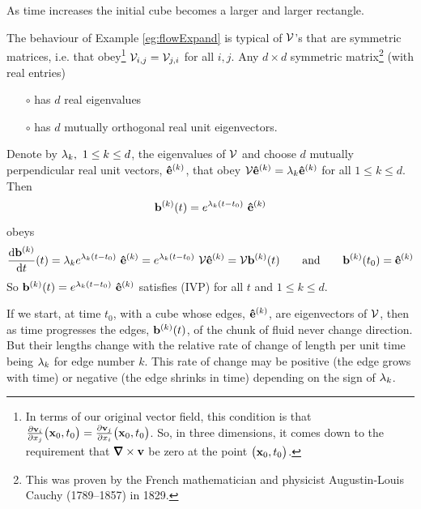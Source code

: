 As time increases the initial cube becomes a larger and larger rectangle.

\begin{eg}\label{eg:flowExpandB}
The behaviour of Example \ref{eg:flowExpand} is typical of $\mathcal{V}$'s 
that are symmetric matrices,
i.e. that obey\footnote{In terms of our original vector field, this condition
is that 
$\frac{\partial \mathbf{v}_i}{\partial x_j}\big(\mathbf{x}_0,t_0\big)
=\frac{\partial \mathbf{v}_j}{\partial x_i}\big(\mathbf{x}_0,t_0\big)$.
So, in three dimensions, it comes down to the requirement that 
$\vnabla\times\vv$ be zero at the point $\big(\mathbf{x}_0,t_0\big)$.}
 $\mathcal{V}_{i,j}=\mathcal{V}_{j,i}$ for all $i,j$. 
Any $d\times d$ symmetric matrix\footnote{This was proven by the French mathematician and physicist Augustin-Louis Cauchy (1789--1857) in 1829.} 
(with real entries)
\begin{itemize}\itemsep1pt \parskip0pt  %
\item[$\circ$]
 has $d$ real eigenvalues
\item[$\circ$] 
has $d$ mutually orthogonal real unit eigenvectors.
\end{itemize}
Denote by $\lambda_k,\ 1\le k\le d$, the eigenvalues of $\mathcal{V}$ and choose
$d$ mutually perpendicular real unit vectors, $\mathbf{\hat e}^{(k)}$,  that obey 
$\mathcal{V}\mathbf{\hat e}^{(k)}=\lambda_k\mathbf{\hat e}^{(k)}$ for all $1\le k\le d$. Then
\begin{equation*}
\vb^{(k)}(t)=e^{\la_k (t-t_0)}\ \ha{k}
\end{equation*}
obeys
\begin{equation*}
\diff{\vb^{(k)}}{t}(t)=\la_ke^{\la_k (t-t_0)}\ \ha{k}=e^{\la_k (t-t_0)}\ \cV\ha{k}
=\cV\vb^{(k)}(t)\qquad\text{and}\qquad
\vb^{(k)}(t_0)= \ha{k}
\end{equation*}
So $\mathbf{b}^{(k)}(t)=e^{\lambda_k (t-t_0)}\ \mathbf{\hat e}^{(k)}$ satisfies (IVP) for all $t$ and 
$1\le k\le d$. 

If we start, at time $t_0$, with a cube whose edges, $\mathbf{\hat e}^{(k)}$,
 are eigenvectors of $\mathcal{V}$, then as time progresses the edges, 
$\mathbf{b}^{(k)}(t)$, of the chunk of fluid never change direction. But their lengths 
change with the relative rate of change of length per unit time being $\lambda_k$
for edge number $k$. This rate of change may be positive (the edge grows
with time) or negative (the edge shrinks in time) depending on the sign
of $\lambda_k$. 


\end{eg}
